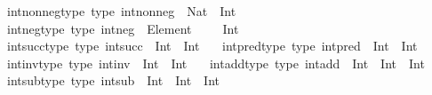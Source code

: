 \begin{isabellebody}
\isanewline
\isanewline
{}\isamarkupfalse%
\isanewline
\ \ \ int{\isacharunderscore}{\kern0pt}nonneg{\isacharunderscore}{\kern0pt}type\ {\isacharbrackleft}{\kern0pt}type{\isacharbrackright}{\kern0pt}{\isacharcolon}{\kern0pt}\ {\isachardoublequoteopen}int{\isacharunderscore}{\kern0pt}nonneg\ {\isacharcolon}{\kern0pt}\ Nat\ {\isasymRightarrow}\ Int{\isachardoublequoteclose}\isanewline
\ \ \ int{\isacharunderscore}{\kern0pt}neg{\isacharunderscore}{\kern0pt}type\ {\isacharbrackleft}{\kern0pt}type{\isacharbrackright}{\kern0pt}{\isacharcolon}{\kern0pt}\ {\isachardoublequoteopen}int{\isacharunderscore}{\kern0pt}neg\ {\isacharcolon}{\kern0pt}\ Element\ {\isacharparenleft}{\kern0pt}{\isasymnat}\ {\isasymsetminus}\ {\isacharbraceleft}{\kern0pt}{}{\isacharbraceright}{\kern0pt}{\isacharparenright}{\kern0pt}\ {\isasymRightarrow}\ Int{\isachardoublequoteclose}\isanewline
\ \ \ int{\isacharunderscore}{\kern0pt}succ{\isacharunderscore}{\kern0pt}type\ {\isacharbrackleft}{\kern0pt}type{\isacharbrackright}{\kern0pt}{\isacharcolon}{\kern0pt}\ {\isachardoublequoteopen}int{\isacharunderscore}{\kern0pt}succ\ {\isacharcolon}{\kern0pt}\ Int\ {\isasymRightarrow}\ Int{\isachardoublequoteclose}\isanewline
\ \ \ int{\isacharunderscore}{\kern0pt}pred{\isacharunderscore}{\kern0pt}type\ {\isacharbrackleft}{\kern0pt}type{\isacharbrackright}{\kern0pt}{\isacharcolon}{\kern0pt}\ {\isachardoublequoteopen}int{\isacharunderscore}{\kern0pt}pred\ {\isacharcolon}{\kern0pt}\ Int\ {\isasymRightarrow}\ Int{\isachardoublequoteclose}\isanewline
\ \ \ int{\isacharunderscore}{\kern0pt}inv{\isacharunderscore}{\kern0pt}type\ {\isacharbrackleft}{\kern0pt}type{\isacharbrackright}{\kern0pt}{\isacharcolon}{\kern0pt}\ {\isachardoublequoteopen}int{\isacharunderscore}{\kern0pt}inv\ {\isacharcolon}{\kern0pt}\ Int\ {\isasymRightarrow}\ Int{\isachardoublequoteclose}\isanewline
\ \ \ int{\isacharunderscore}{\kern0pt}add{\isacharunderscore}{\kern0pt}type\ {\isacharbrackleft}{\kern0pt}type{\isacharbrackright}{\kern0pt}{\isacharcolon}{\kern0pt}\ {\isachardoublequoteopen}int{\isacharunderscore}{\kern0pt}add\ {\isacharcolon}{\kern0pt}\ Int\ {\isasymRightarrow}\ Int\ {\isasymRightarrow}\ Int{\isachardoublequoteclose}\isanewline
\ \ \ int{\isacharunderscore}{\kern0pt}sub{\isacharunderscore}{\kern0pt}type\ {\isacharbrackleft}{\kern0pt}type{\isacharbrackright}{\kern0pt}{\isacharcolon}{\kern0pt}\ {\isachardoublequoteopen}int{\isacharunderscore}{\kern0pt}sub\ {\isacharcolon}{\kern0pt}\ Int\ {\isasymRightarrow}\ Int\ {\isasymRightarrow}\ Int{\isachardoublequoteclose}\isanewline

\end{isabellebody}

